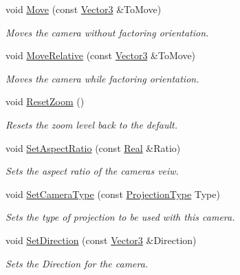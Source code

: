 \begin{DoxyCompactItemize}
void \hyperlink{classphys_1_1Camera_a63cce67b42008ee8ce481b1ffd7fcbdf}{Move} (const \hyperlink{classphys_1_1Vector3}{Vector3} \&ToMove)
\begin{DoxyCompactList}\small\item\em Moves the camera without factoring orientation. \item\end{DoxyCompactList}\item 
void \hyperlink{classphys_1_1Camera_a34a5a7b76016042ce8b2278c35437486}{MoveRelative} (const \hyperlink{classphys_1_1Vector3}{Vector3} \&ToMove)
\begin{DoxyCompactList}\small\item\em Moves the camera while factoring orientation. \item\end{DoxyCompactList}\item 
void \hyperlink{classphys_1_1Camera_a181465e6add36c07a63fdd26aee7c69a}{ResetZoom} ()
\begin{DoxyCompactList}\small\item\em Resets the zoom level back to the default. \item\end{DoxyCompactList}\item 
void \hyperlink{classphys_1_1Camera_a731d933c30bc95a83555412184d65cf8}{SetAspectRatio} (const \hyperlink{namespacephys_af7eb897198d265b8e868f45240230d5f}{Real} \&Ratio)
\begin{DoxyCompactList}\small\item\em Sets the aspect ratio of the cameras veiw. \item\end{DoxyCompactList}\item 
void \hyperlink{classphys_1_1Camera_a95d04ee7482ae6670229f59d63ee8926}{SetCameraType} (const \hyperlink{classphys_1_1Camera_a87d8d46e9eb2080b10712079be69d86a}{ProjectionType} Type)
\begin{DoxyCompactList}\small\item\em Sets the type of projection to be used with this camera. \item\end{DoxyCompactList}\item 
void \hyperlink{classphys_1_1Camera_a6ece06a179798b3240362b1bcb751f2f}{SetDirection} (const \hyperlink{classphys_1_1Vector3}{Vector3} \&Direction)
\begin{DoxyCompactList}\small\item\em Sets the Direction for the camera. \item\end{DoxyCompactList}\item 

\end{DoxyCompactItemize}
